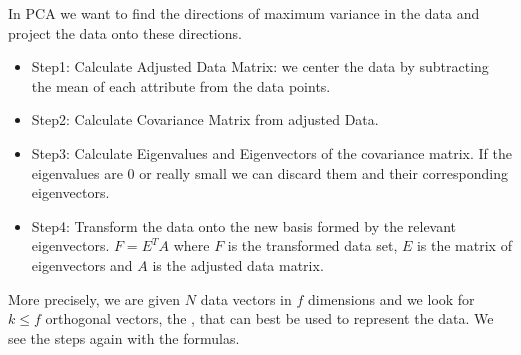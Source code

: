 In PCA we want to find the directions of maximum variance in the data and project the data onto these directions. 
\begin{itemize}
    \item Step1: Calculate Adjusted Data Matrix: we center the data by subtracting the mean of each attribute from the data points.
    \item Step2: Calculate Covariance Matrix from adjusted Data.
    \item Step3: Calculate Eigenvalues and Eigenvectors of the covariance matrix. If the eigenvalues are 0 or really small we can discard them and their corresponding eigenvectors.
    \item Step4: Transform the data onto the new basis formed by the relevant eigenvectors. $F=E^TA$ where $F$ is the transformed data set, $E$ is the matrix of eigenvectors and $A$ is the adjusted data matrix.
\end{itemize}

More precisely, we are given $N$ data vectors in $f$ dimensions and we look for $k \leq f$ orthogonal vectors, the , that can best be used to represent the data. We see the steps again with the formulas.

